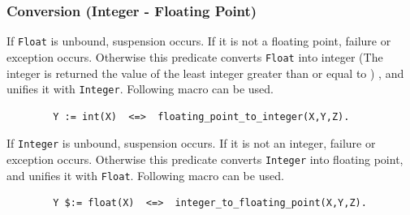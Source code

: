 \subsubsection{Conversion (Integer - Floating Point)}
\begin{itemize}
If \verb|Float| is unbound, suspension occurs.
If it is not a floating point, failure or exception occurs.
Otherwise this predicate converts \verb|Float| into integer
(The integer is returned the value of
the least integer greater than  or equal to ) ,
and unifies it with \verb|Integer|.
Following macro can be used.
\begin{verbatim}
        Y := int(X)  <=>  floating_point_to_integer(X,Y,Z).
\end{verbatim}

If \verb|Integer| is unbound, suspension occurs.
If it is not an integer, failure or exception occurs.
Otherwise this predicate converts \verb|Integer| into floating point,
and unifies it with \verb|Float|.
Following macro can be used.
\begin{verbatim}
        Y $:= float(X)  <=>  integer_to_floating_point(X,Y,Z).
\end{verbatim}

\end{itemize}
